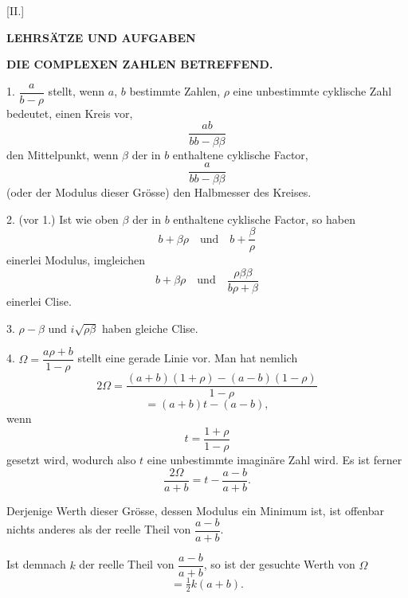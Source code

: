 
\begin{center}
[II.]

\textbf{LEHRSÄTZE UND AUFGABEN}

\textbf{DIE COMPLEXEN ZAHLEN BETREFFEND.}
\end{center}

1. $\dfrac{a}{b-\rho}$ stellt, wenn $a$, $b$ bestimmte Zahlen, $\rho$ eine
unbestimmte cyklische Zahl bedeutet, einen Kreis vor,
\[
\dfrac{ab}{bb-\beta\beta}
\]
den Mittelpunkt, wenn $\beta$ der in $b$ enthaltene cyklische Factor,
\[
\dfrac{a}{bb-\beta\beta}
\]
(oder der Modulus dieser Grösse) den Halbmesser des Kreises.

2. (vor 1.) Ist wie oben $\beta$ der in $b$ enthaltene cyklische Factor, so
haben
\[
b + \beta\rho \quad \text{und} \quad b + \dfrac{\beta}{\rho}
\]
einerlei Modulus, imgleichen
\[
b + \beta\rho \quad \text{und} \quad \dfrac{\rho\beta\beta}{b\rho+\beta}
\]
einerlei Clise.

3. $\rho - \beta$ und $i\sqrt{\rho\beta}$ haben gleiche Clise.

4. $\Omega = \dfrac{a\rho+b}{1-\rho}$ stellt eine gerade Linie vor. Man hat
nemlich
\[
2\Omega = \dfrac{(a+b)(1+\rho) - (a-b)(1-\rho)}{1-\rho}
\]
\[
= (a+b)t - (a-b),
\]
wenn
\[
t = \dfrac{1+\rho}{1-\rho}
\]
gesetzt wird, wodurch also $t$ eine unbestimmte imaginäre Zahl wird. Es ist
ferner
\[
\dfrac{2\Omega}{a+b} = t - \dfrac{a-b}{a+b}.
\]

Derjenige Werth dieser Grösse, dessen Modulus ein Minimum ist, ist offenbar
nichts anderes als der reelle Theil von $\dfrac{a-b}{a+b}$.

Ist demnach $k$ der reelle Theil von $\dfrac{a-b}{a+b}$, so ist der
gesuchte Werth von $\Omega$
\[
= \tfrac{1}{2} k (a+b).
\]
